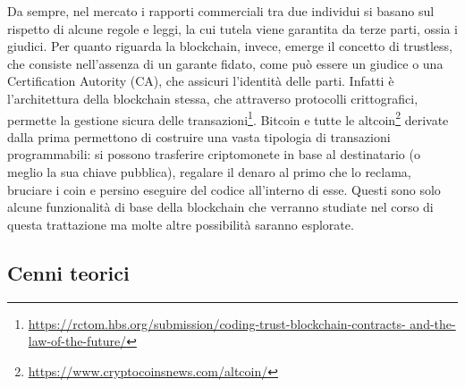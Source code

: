 	Da sempre, nel mercato i rapporti commerciali tra due individui si basano sul rispetto di alcune regole e leggi, la cui tutela viene garantita da terze parti, ossia i giudici. Per quanto riguarda la blockchain, invece, emerge il concetto di trustless, che consiste nell'assenza di un garante fidato, come può essere un giudice o una Certification Autority (CA), che assicuri l'identità delle parti. Infatti è l'architettura della blockchain stessa, che attraverso protocolli crittografici, permette la gestione sicura delle transazioni\footnote{ \url{https://rctom.hbs.org/submission/coding-trust-blockchain-contracts- and-the-law-of-the-future/}}.  
	Bitcoin e tutte le altcoin\footnote{ \url{https://www.cryptocoinsnews.com/altcoin/} } derivate dalla prima permettono di costruire una vasta tipologia di transazioni programmabili: si possono trasferire criptomonete in base al destinatario (o meglio la sua chiave pubblica), regalare il denaro al primo che lo reclama, bruciare i coin e persino eseguire del codice all'interno di esse. Questi sono solo alcune funzionalità di base della blockchain che verranno studiate nel corso di questa trattazione ma molte altre possibilità saranno esplorate.
	
	\subsection{Cenni teorici}

